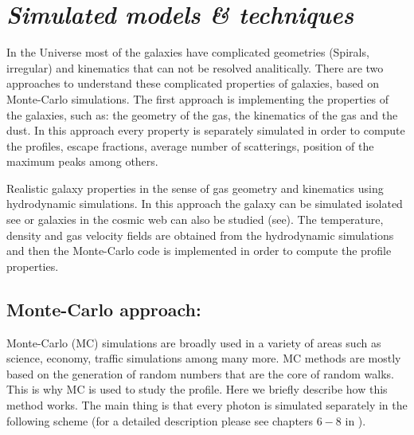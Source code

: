\section{\emph{Simulated models \& techniques}}

In the Universe most of the galaxies have complicated
geometries (Spirals, irregular) and kinematics that 
can not be resolved analitically. There are two approaches
to understand these complicated properties of galaxies, based
on Monte-Carlo simulations. The first approach is implementing 
the properties of the galaxies, such as: the geometry
of the gas, the kinematics of the gas and the dust. In this 
approach every property is separately simulated in order
to compute the \ly profiles, escape fractions, average number
of scatterings, position of the maximum peaks among others. 

Realistic galaxy properties in the sense of gas geometry
and kinematics using hydrodynamic simulations. In this 
approach the galaxy can be simulated isolated see \citep{Verhamme12}
or galaxies in the cosmic web can also be studied (see\citep{Yajima12}).
The temperature, density and gas velocity fields are obtained from 
the hydrodynamic simulations and then the Monte-Carlo code is 
implemented in order to compute the profile properties.

\subsection{Monte-Carlo approach:}

Monte-Carlo (MC) simulations are broadly used in a variety of 
areas such as science, economy, traffic simulations among 
many more. MC methods are mostly based on the
generation of random numbers that are the core of 
random walks. This is why MC is used to study the
\ly profile. Here we briefly describe how this method 
works. The main thing is that every \ly photon is simulated
separately in the following scheme (for a detailed description 
please see chapters $6-8$ in \citep{LaursenPhD}).

